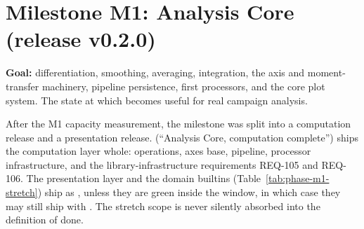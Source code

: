 \section{Milestone M1: Analysis Core (release v0.2.0)}

\textbf{Goal:} differentiation, smoothing, averaging, integration, the
axis and moment-transfer machinery, pipeline persistence, first
processors, and the core plot system. The state at which \itc{} becomes
useful for real campaign analysis.

\begin{noteinfo}[Re-baseline of 2026-07-23]
After the M1 capacity measurement, the milestone was split into a
computation release and a presentation release. 
(``Analysis Core, computation complete'') ships the computation layer
whole: operations, axes base, pipeline, processor infrastructure, and
the library-infrastructure requirements REQ-105 and REQ-106. The
presentation layer and the domain builtins
(Table~\ref{tab:phase-m1-stretch}) ship as , unless they
are green inside the  window, in which case they may
still ship with . The stretch scope is never silently
absorbed into the  definition of done.
\end{noteinfo}

